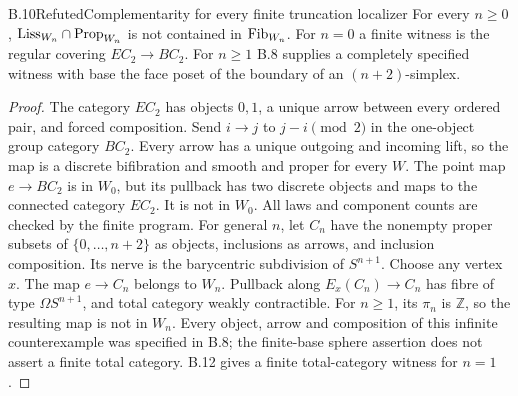 \begin{claim}{B.10}{Refuted}{Complementarity for every finite truncation localizer}
For every $n\geq0$, $\mathrm{Liss}_{W_n}\cap\mathrm{Prop}_{W_n}$ is not contained in
$\mathrm{Fib}_{W_n}$. For $n=0$ a finite witness is the regular covering
$EC_2\to BC_2$. For $n\geq1$ B.8 supplies a completely specified witness
with base the face poset of the boundary of an $(n+2)$-simplex.
\end{claim}
\begin{proof}
The category $EC_2$ has objects $0,1$, a unique arrow between every ordered
pair, and forced composition. Send $i\to j$ to $j-i\pmod2$ in the one-object
group category $BC_2$. Every arrow has a unique outgoing and incoming lift,
so the map is a discrete bifibration and smooth and proper for every $W$.
The point map $e\to BC_2$ is in $W_0$, but its pullback has two discrete
objects and maps to the connected category $EC_2$. It is not in $W_0$.
All laws and component counts are checked by the finite program.
For general $n$, let $C_n$ have the nonempty proper subsets of
$\{0,\ldots,n+2\}$ as objects, inclusions as arrows, and inclusion composition.
Its nerve is the barycentric subdivision of $S^{n+1}$. Choose any vertex $x$.
The map $e\to C_n$ belongs to $W_n$. Pullback along $E_x(C_n)\to C_n$
has fibre of type $\Omega S^{n+1}$, and total category weakly contractible.
For $n\geq1$, its $\pi_n$ is $\mathbb Z$, so the resulting map is not in
$W_n$. Every object, arrow and composition of this infinite counterexample
was specified in B.8; the finite-base sphere assertion does not assert a
finite total category. B.12 gives a finite total-category witness for $n=1$.
\end{proof}

